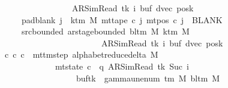 \begin{isabellebody}
\ \ \ \ \ \ \ \ \ \ \ \ \ \ \ \ \ \ \ {\isacharparenleft}{\kern0pt}AR{\isacharunderscore}{\kern0pt}SimRead{\isacharcomma}{\kern0pt}\ tk{\isacharcomma}{\kern0pt}\ i{\isacharcomma}{\kern0pt}\ buf{\isacharcomma}{\kern0pt}\ dvec{\isacharcomma}{\kern0pt}\ posk{\isacharparenright}{\kern0pt}{\isachardoublequoteclose}\isanewline
\ \ \ \ \ \ \ pad{\isacharunderscore}{\kern0pt}blank{\isacharcolon}{\kern0pt}\ {\isachardoublequoteopen}{\isasymforall}j\ {\isasymge}\ k{\isacharunderscore}{\kern0pt}tm\ M{\isachardot}{\kern0pt}\ mt{\isacharunderscore}{\kern0pt}tape\ c{\isacharprime}{\kern0pt}\ j\ {\isacharparenleft}{\kern0pt}mt{\isacharunderscore}{\kern0pt}pos\ c{\isacharprime}{\kern0pt}\ j{\isacharparenright}{\kern0pt}\ {\isacharequal}{\kern0pt}\ BLANK{}{\isachardoublequoteclose}\isanewline
\ \ \ \ \ \ \ src{\isacharunderscore}{\kern0pt}bounded{\isacharcolon}{\kern0pt}\ {\isachardoublequoteopen}ar{\isacharunderscore}{\kern0pt}stage{\isacharunderscore}{\kern0pt}bounded\ {\isacharparenleft}{\kern0pt}bl{\isacharunderscore}{\kern0pt}tm\ M{\isacharparenright}{\kern0pt}\ {\isacharparenleft}{\kern0pt}k{\isacharunderscore}{\kern0pt}tm\ M{\isacharparenright}{\kern0pt}\isanewline
\ \ \ \ \ \ \ \ \ \ \ \ \ \ \ \ \ \ \ \ \ \ \ \ \ \ {\isacharparenleft}{\kern0pt}AR{\isacharunderscore}{\kern0pt}SimRead{\isacharcomma}{\kern0pt}\ tk{\isacharcomma}{\kern0pt}\ i{\isacharcomma}{\kern0pt}\ buf{\isacharcomma}{\kern0pt}\ dvec{\isacharcomma}{\kern0pt}\ posk{\isacharparenright}{\kern0pt}{\isachardoublequoteclose}\isanewline
\ \ \ {\isachardoublequoteopen}{\isasymexists}c{\isacharprime}{\kern0pt}{\isacharprime}{\kern0pt}{\isachardot}{\kern0pt}\ {\isacharparenleft}{\kern0pt}c{\isacharprime}{\kern0pt}{\isacharcomma}{\kern0pt}\ c{\isacharprime}{\kern0pt}{\isacharprime}{\kern0pt}{\isacharparenright}{\kern0pt}\ {\isasymin}\ mttm{\isacharunderscore}{\kern0pt}step\ {\isacharparenleft}{\kern0pt}alphabet{\isacharunderscore}{\kern0pt}reduce{\isacharunderscore}{\kern0pt}delta\ M{\isacharparenright}{\kern0pt}\isanewline
\ \ \ \ \ \ \ \ \ \ \ \ \ \ {\isasymand}\ mt{\isacharunderscore}{\kern0pt}state\ c{\isacharprime}{\kern0pt}{\isacharprime}{\kern0pt}\ {\isacharequal}{\kern0pt}\ {\isacharparenleft}{\kern0pt}q{\isacharcomma}{\kern0pt}\ AR{\isacharunderscore}{\kern0pt}SimRead{\isacharcomma}{\kern0pt}\ tk{\isacharcomma}{\kern0pt}\ Suc\ i{\isacharcomma}{\kern0pt}\isanewline
\ \ \ \ \ \ \ \ \ \ \ \ \ \ \ \ \ \ \ \ buf{\isacharparenleft}{\kern0pt}tk\ {\isacharcolon}{\kern0pt}{\isacharequal}{\kern0pt}\ gamma{\isacharunderscore}{\kern0pt}unenum\ {\isacharparenleft}{\kern0pt}{\isasymGamma}{\isacharunderscore}{\kern0pt}tm\ M{\isacharparenright}{\kern0pt}\ {\isacharparenleft}{\kern0pt}bl{\isacharunderscore}{\kern0pt}tm\ M{\isacharparenright}{\kern0pt}\isanewline

\end{isabellebody}
